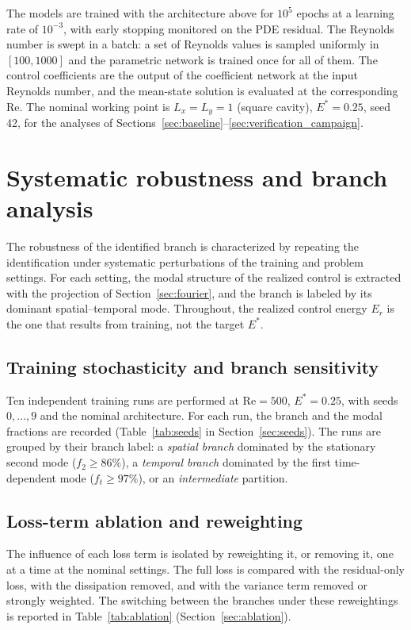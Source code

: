 \documentclass[aip,pof,reprint,superscriptaddress]{revtex4-2}
\newcommand{\re}{\mathrm{Re}}
\begin{document}
The models are trained with the architecture above for $10^5$ epochs at a learning rate of $10^{-3}$, with early stopping monitored on the PDE residual. The Reynolds number is swept in a batch: a set of Reynolds values is sampled uniformly in $[100,1000]$ and the parametric network is trained once for all of them. The control coefficients are the output of the coefficient network at the input Reynolds number, and the mean-state solution is evaluated at the corresponding $\re$. The nominal working point is $L_x=L_y=1$ (square cavity), $E^*=0.25$, seed 42, for the analyses of Sections~\ref{sec:baseline}--\ref{sec:verification_campaign}.

\section{Systematic robustness and branch analysis}\label{sec:robustness}

The robustness of the identified branch is characterized by repeating the identification under systematic perturbations of the training and problem settings. For each setting, the modal structure of the realized control is extracted with the projection of Section~\ref{sec:fourier}, and the branch is labeled by its dominant spatial--temporal mode. Throughout, the realized control energy $E_r$ is the one that results from training, not the target $E^*$.

\subsection{Training stochasticity and branch sensitivity}\label{sec:robustness_seeds}

Ten independent training runs are performed at $\re=500$, $E^*=0.25$, with seeds $0,\dots,9$ and the nominal architecture. For each run, the branch and the modal fractions are recorded (Table~\ref{tab:seeds} in Section~\ref{sec:seeds}). The runs are grouped by their branch label: a \emph{spatial branch} dominated by the stationary second mode ($f_2\ge86\%$), a \emph{temporal branch} dominated by the first time-dependent mode ($f_t\ge97\%$), or an \emph{intermediate} partition.

\subsection{Loss-term ablation and reweighting}\label{sec:ablation-methods}

The influence of each loss term is isolated by reweighting it, or removing it, one at a time at the nominal settings. The full loss is compared with the residual-only loss, with the dissipation removed, and with the variance term removed or strongly weighted. The switching between the branches under these reweightings is reported in Table~\ref{tab:ablation} (Section~\ref{sec:ablation}).
\end{document}
